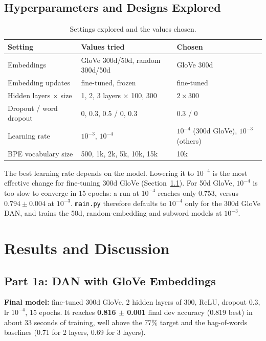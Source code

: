 \documentclass[10pt]{article}
\begin{document}
\subsection{Hyperparameters and Designs Explored}

\begin{table}[htbp]
\centering
\small
\begin{tabular}{lll}
\toprule
Setting & Values tried & Chosen \\
\midrule
Embeddings & GloVe 300d/50d, random 300d/50d & GloVe 300d \\
Embedding updates & fine-tuned, frozen & fine-tuned \\
Hidden layers $\times$ size & 1, 2, 3 layers $\times$ 100, 300 & $2 \times 300$ \\
Dropout / word dropout & 0, 0.3, 0.5 / 0, 0.3 & 0.3 / 0 \\
Learning rate & $10^{-3}$, $10^{-4}$ & $10^{-4}$ (300d GloVe), $10^{-3}$ (others) \\
BPE vocabulary size & 500, 1k, 2k, 5k, 10k, 15k & 10k \\
\bottomrule
\end{tabular}
\caption{Settings explored and the values chosen.}
\label{tab:hparams}
\end{table}

The best learning rate depends on the model. Lowering it to $10^{-4}$ is the most effective change for fine-tuning
300d GloVe (Section~\ref{sec:1a}). For 50d GloVe, $10^{-4}$ is too slow to converge in 15 epochs: a run at
$10^{-4}$ reaches only 0.753, versus $0.794 \pm 0.004$ at $10^{-3}$. \texttt{main.py} therefore defaults to
$10^{-4}$ only for the 300d GloVe DAN, and trains the 50d, random-embedding and subword models at $10^{-3}$.

\section{Results and Discussion}

\subsection{Part 1a: DAN with GloVe Embeddings}
\label{sec:1a}

\textbf{Final model:} fine-tuned 300d GloVe, 2 hidden layers of 300, ReLU, dropout 0.3, lr $10^{-4}$, 15 epochs. It
reaches \textbf{0.816 $\pm$ 0.001} final dev accuracy (0.819 best) in about 33 seconds of training, well above the
77\% target and the bag-of-words baselines (0.71 for 2 layers, 0.69 for 3 layers).
\end{document}
